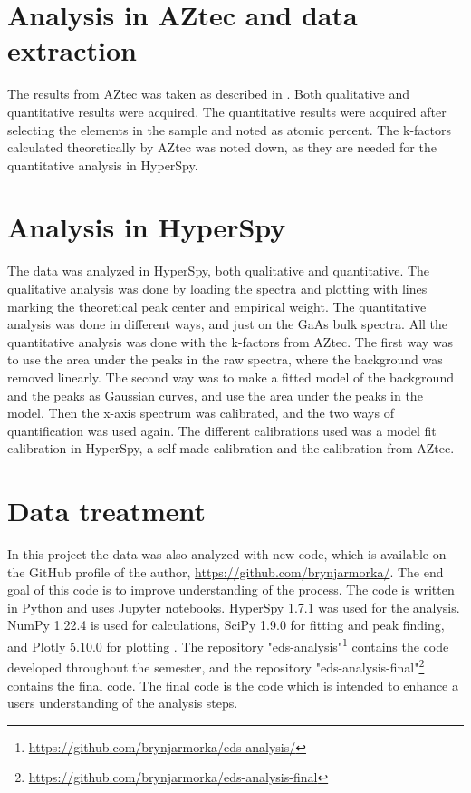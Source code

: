 

%
%
\section{Analysis in AZtec and data extraction}
\label{sec:method:aztec}
The results from AZtec was taken as described in \cite[Appendix A]{lundeby_improving_2019}.
Both qualitative and quantitative results were acquired.
The quantitative results were acquired after selecting the elements in the sample and noted as atomic percent.
The k-factors calculated theoretically by AZtec was noted down, as they are needed for the quantitative analysis in HyperSpy.



%
%
\section{Analysis in HyperSpy}
\label{sec:method:hspy}
The data was analyzed in HyperSpy, both qualitative and quantitative.
The qualitative analysis was done by loading the spectra and plotting with lines marking the theoretical peak center and empirical weight.
The quantitative analysis was done in different ways, and just on the GaAs bulk spectra.
All the quantitative analysis was done with the k-factors from AZtec.
The first way was to use the area under the peaks in the raw spectra, where the background was removed linearly.
The second way was to make a fitted model of the background and the peaks as Gaussian curves, and use the area under the peaks in the model.
Then the x-axis spectrum was calibrated, and the two ways of quantification was used again.
The different calibrations used was a model fit calibration in HyperSpy, a self-made calibration and the calibration from AZtec.


%
%
\section{Data treatment}
\label{sec:method:treatment}
In this project the data was also analyzed with new code, which is available on the GitHub profile of the author, \url{https://github.com/brynjarmorka/}.
The end goal of this code is to improve understanding of the process.
The code is written in Python and uses Jupyter notebooks.
HyperSpy 1.7.1 was used for the analysis.
NumPy 1.22.4 is used for calculations, SciPy 1.9.0 for fitting and peak finding, and Plotly 5.10.0 for plotting .
The repository "eds-analysis"\footnote{\url{https://github.com/brynjarmorka/eds-analysis/}} contains the code developed throughout the semester, and the repository "eds-analysis-final"\footnote{\url{https://github.com/brynjarmorka/eds-analysis-final}} contains the final code.
The final code is the code which is intended to enhance a users understanding of the analysis steps.

